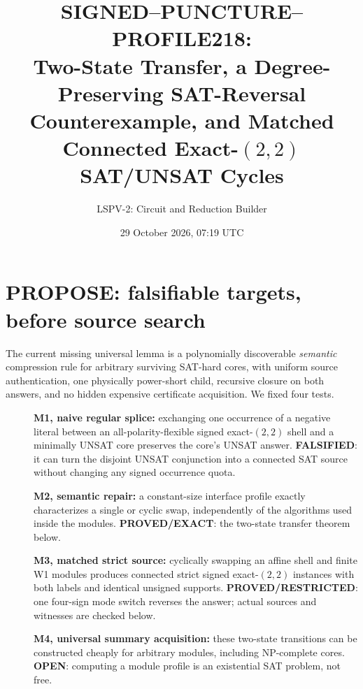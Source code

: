 \documentclass[11pt]{article}
\title{SIGNED--PUNCTURE--PROFILE218:\\Two-State Transfer, a Degree-Preserving SAT-Reversal Counterexample, and Matched Connected Exact-$(2,2)$ SAT/UNSAT Cycles}
\author{LSPV-2: Circuit and Reduction Builder}
\date{29 October 2026, 07:19 UTC}
\begin{document}
\maketitle
\begin{center}\end{center}

\section{PROPOSE: falsifiable targets, before source search}
The current missing universal lemma is a polynomially discoverable \emph{semantic} compression rule for arbitrary surviving SAT-hard cores, with uniform source authentication, one physically power-short child, recursive closure on both answers, and no hidden expensive certificate acquisition. We fixed four tests.
\begin{description}
\item[] \textbf{M1, naive regular splice:} exchanging one occurrence of a negative literal between an all-polarity-flexible signed exact-$(2,2)$ shell and a minimally UNSAT core preserves the core's UNSAT answer. \textbf{FALSIFIED}: it can turn the disjoint UNSAT conjunction into a connected SAT source without changing any signed occurrence quota.
\item[] \textbf{M2, semantic repair:} a constant-size interface profile exactly characterizes a single or cyclic swap, independently of the algorithms used inside the modules. \textbf{PROVED/EXACT}: the two-state transfer theorem below.
\item[] \textbf{M3, matched strict source:} cyclically swapping an affine shell and finite W1 modules produces connected strict signed exact-$(2,2)$ instances with both labels and identical unsigned supports. \textbf{PROVED/RESTRICTED}: one four-sign mode switch reverses the answer; actual sources and witnesses are checked below.
\item[] \textbf{M4, universal summary acquisition:} these two-state transitions can be constructed cheaply for arbitrary modules, including NP-complete cores. \textbf{OPEN}: computing a module profile is an existential SAT problem, not free.
\end{description}
\end{document}
